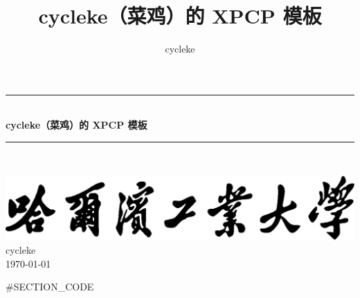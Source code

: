 \documentclass[twoside]{article}
\title{cycleke（菜鸡）的 XPCP 模板}
\author{cycleke}
\newcommand{\HRule}{\rule{\linewidth}{0.5mm}}
\begin{document}
\begin{titlepage}
  \begin{center}
    \HRule{} \\ [1cm]
    \textbf{\Huge{cycleke（菜鸡）的 XPCP 模板}} \\ [0.5cm]
    \HRule{} \\ [4cm]

    \vfill
    \begin{figure}[H]
      \centering
       \quad
    \end{figure}
    \includegraphics[width=.55\linewidth]{school} \\ [2cm]
    \LARGE{cycleke} \\ [1cm]
    \Large{\today}
  \end{center}
  \clearpage
\end{titlepage}

\tableofcontents\clearpage
\pagestyle{fancy}
\lfoot{}
\cfoot{\thepage}\rfoot{}
\setcounter{section}{0}
\setcounter{page}{1}
\clearpage

#SECTION_CODE
\end{document}
